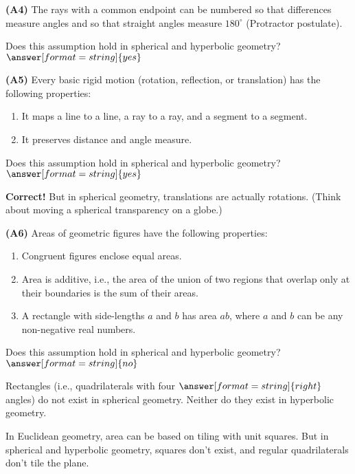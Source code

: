 \documentclass[nooutcomes]{ximera}
\begin{document}
\begin{problem}
\textbf{(A4)} The rays with a common endpoint can be numbered so that differences measure angles and so that straight angles measure $180^\circ$ (Protractor postulate). 

Does this assumption hold in spherical and hyperbolic geometry? 
$\answer[format=string]{yes}$
\end{problem}

\begin{problem}
\textbf{(A5)} Every basic rigid motion (rotation, reflection, or translation) has the following properties:
\begin{enumerate}
\item It maps a line to a line, a ray to a ray, and a segment to a segment.
\item It preserves distance and angle measure.
\end{enumerate}

Does this assumption hold in spherical and hyperbolic geometry? 
$\answer[format=string]{yes}$
\begin{feedback}
\textbf{Correct!} But in spherical geometry, translations are actually rotations.  (Think about moving a spherical transparency on a globe.) 
\end{feedback}
\end{problem}

\begin{problem}
\textbf{(A6)} Areas of geometric figures have the following properties: 
\begin{enumerate}
\item Congruent figures enclose equal areas.
\item Area is additive, i.e., the area of the union of two regions that overlap only at their boundaries is the sum of their areas. 
\item A rectangle with side-lengths $a$ and $b$ has area $ab$, where $a$ and $b$ can be any non-negative real numbers.
\end{enumerate}

Does this assumption hold in spherical and hyperbolic geometry? 
$\answer[format=string]{no}$
\begin{problem}
Rectangles (i.e., quadrilaterals with four $\answer[format=string]{right}$ angles) do not exist in spherical geometry.  Neither do they exist in hyperbolic geometry.  

In Euclidean geometry, area can be based on tiling with unit squares.  But in spherical and hyperbolic geometry, squares don't exist, and regular quadrilaterals don't tile the plane.
\end{problem}
\end{problem}
\end{document}

